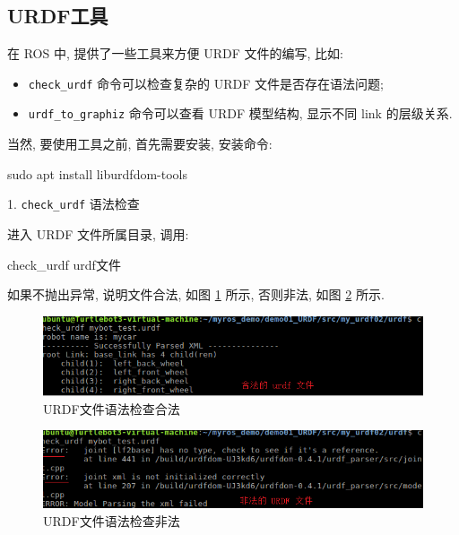 \documentclass[openany, fontset=windowsold]{ctexbook}
\theoremstyle{kaiti}
\theoremstyle{normal}
\begin{document}
\subsection{URDF工具}

在 ROS 中, 提供了一些工具来方便 URDF 文件的编写, 比如:

\begin{itemize}
  \item \verb|check_urdf| 命令可以检查复杂的 URDF 文件是否存在语法问题;
  \item \verb|urdf_to_graphiz| 命令可以查看 URDF 模型结构, 显示不同 link 的层级关系.
\end{itemize}

当然, 要使用工具之前, 首先需要安装, 安装命令:

\begin{bash}
  sudo apt install liburdfdom-tools
\end{bash}

1. \verb|check_urdf| 语法检查

进入 URDF 文件所属目录, 调用:

\begin{bash}
  check_urdf urdf文件
\end{bash}

如果不抛出异常, 说明文件合法, 如图 \ref{fig:check_urdf_ok} 所示, 否则非法, 如图 \ref{fig:check_urdf_error} 所示.

\begin{figure}[!ht]
  \centering
  \includegraphics[width=.9\textwidth]{check_urdf_ok.png}
  \caption{URDF文件语法检查合法}
  \label{fig:check_urdf_ok}
\end{figure}

\begin{figure}[!ht]
  \centering
  \includegraphics[width=.9\textwidth]{check_urdf_error.png}
  \caption{URDF文件语法检查非法}
  \label{fig:check_urdf_error}
\end{figure}
\end{document}
